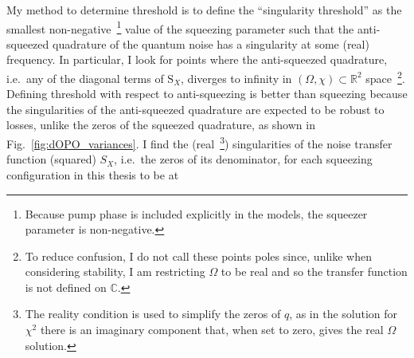 My method to determine threshold is to define the ``singularity threshold'' as the smallest non-negative~\footnote{Because pump phase is included explicitly in the models, the squeezer parameter is non-negative.} value of the squeezing parameter such that the anti-squeezed quadrature of the quantum noise has a singularity at some (real) frequency. In particular, I look for points where the anti-squeezed quadrature, i.e.\ any of the diagonal terms of $\text{S}_X$, diverges to infinity in $(\Omega,\chi)\subset\mathbb{R}^2$ space~\footnote{To reduce confusion, I do not call these points poles since, unlike when considering stability, I am restricting $\Omega$ to be real and so the transfer function is not defined on $\mathbb{C}$.}. %
Defining threshold with respect to anti-squeezing is better than squeezing because the singularities of the anti-squeezed quadrature are expected to be robust to losses, unlike the zeros of the squeezed quadrature, as shown in Fig.~\ref{fig:dOPO_variances}. 
I find the (real~\footnote{The reality condition is used to simplify the zeros of $q$, as in the solution for $\chi^2$ there is an imaginary component that, when set to zero, gives the real $\Omega$ solution.}) singularities of the noise transfer function (squared) $S_X$, i.e.\ the zeros of its denominator, for each squeezing configuration in this thesis to be at 
\begingroup
\allowdisplaybreaks
